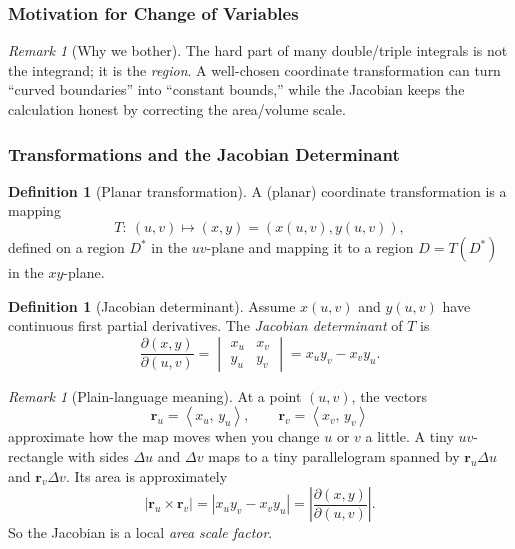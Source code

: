 \documentclass[12pt]{article}
\numberwithin{equation}{section}
\newcommand{\vect}[1]{\boldsymbol{#1}}   %
\theoremstyle{plain}
\theoremstyle{definition}
\newtheorem{definition}[theorem]{Definition}
\theoremstyle{remark}
\newtheorem{remark}[theorem]{Remark}
\begin{document}
\subsubsection{Motivation for Change of Variables}

\begin{remark}[Why we bother]
The hard part of many double/triple integrals is not the integrand; it is the \emph{region}.  
A well-chosen coordinate transformation can turn “curved boundaries” into “constant bounds,” while the Jacobian keeps the calculation honest by correcting the area/volume scale.
\end{remark}

\subsubsection{Transformations and the Jacobian Determinant}

\begin{definition}[Planar transformation]
A (planar) coordinate transformation is a mapping
\[
T:\ (u,v)\mapsto (x,y)=(x(u,v),y(u,v)),
\]
defined on a region $D^\ast$ in the $uv$-plane and mapping it to a region $D=T(D^\ast)$ in the $xy$-plane.
\end{definition}

\begin{definition}[Jacobian determinant]\label{def:jacobian}
Assume $x(u,v)$ and $y(u,v)$ have continuous first partial derivatives. The \emph{Jacobian determinant} of $T$ is
\begin{equation}\label{eq:jacobian}
\frac{\partial(x,y)}{\partial(u,v)}
=
\begin{vmatrix}
x_u & x_v\\
y_u & y_v
\end{vmatrix}
= x_u y_v - x_v y_u.
\end{equation}
\end{definition}

\begin{remark}[Plain-language meaning]
At a point $(u,v)$, the vectors
\[
\vect r_u=\left\langle x_u,\,y_u\right\rangle,\qquad
\vect r_v=\left\langle x_v,\,y_v\right\rangle
\]
approximate how the map moves when you change $u$ or $v$ a little. A tiny $uv$-rectangle with sides $\Delta u$ and $\Delta v$ maps to a tiny parallelogram spanned by $\vect r_u\Delta u$ and $\vect r_v\Delta v$. Its area is approximately
\[
\big|\vect r_u\times \vect r_v\big|
=
\left|x_u y_v-x_v y_u\right|
=
\left|\frac{\partial(x,y)}{\partial(u,v)}\right|.
\]
So the Jacobian is a local \emph{area scale factor}.
\end{remark}
\end{document}
